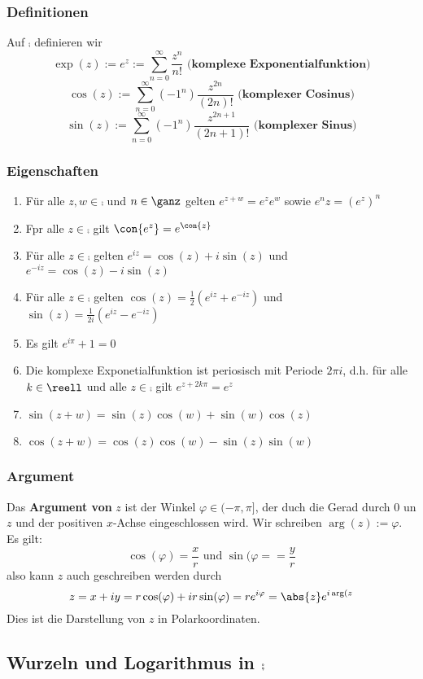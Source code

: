 \documentclass{kit}
\begin{document}
    \subsubsection{Definitionen}
      Auf $\comp$ definieren wir
      $$\exp(z):=e^z:=\sum^\infty_{n=0}\frac{z^n}{n!}\textbf{ (komplexe Exponentialfunktion)}$$
      $$\cos(z):=\sum^\infty_{n=0}(-1^n)\frac{z^{2n}}{(2n)!}\textbf{ (komplexer Cosinus)}$$
      $$\sin(z):=\sum^\infty_{n=0}(-1^n)\frac{z^{2n+1}}{(2n+1)!}\textbf{ (komplexer Sinus)}$$
    \subsubsection{Eigenschaften}
      \begin{enumerate}
        \item Für alle $z,w\in\comp$ und $n\in\ganz$ gelten $e^{z+w}=e^ze^w$ sowie $e^nz=(e^z)^n$
        \item Fpr alle $z\in\comp$ gilt $\con{e^z}=e^{\con{z}}$
        \item Für alle $z\in\comp$ gelten $e^{iz}=\cos(z)+i\sin(z)$ und $e^{-iz}=\cos(z)-i\sin(z)$
        \item Für alle $z\in\comp$ gelten $\cos(z)=\frac{1}{2}(e^{iz}+e^{-iz})$ und $\sin(z)=\frac{1}{2i}(e^{iz}-e^{-iz})$
        \item Es gilt $e^{i\pi}+1=0$
        \item Die komplexe Exponetialfunktion ist periosisch mit Periode $2\pi i$, d.h. für alle $k\in\reell$ und alle 
          $z\in\comp$ gilt $e^{z+2k\pi}=e^z$
        \item $\sin(z+w)=\sin(z)\cos(w)+\sin(w)\cos(z)$
        \item $\cos(z+w)=\cos(z)\cos(w)-\sin(z)\sin(w)$
      \end{enumerate}
    \subsubsection{Argument}
      Das \textbf{Argument von} $z$ ist der Winkel $\varphi\in(-\pi,\pi]$, der duch die Gerad durch 0 un $z$ und der
      positiven $x$-Achse eingeschlossen wird. Wir schreiben $\arg(z):=\varphi$. Es gilt:
      $$\cos(\varphi)=\frac{x}{r}\text{ und }\sin(\varphi==\frac{y}{r}$$
      also kann $z$ auch geschreiben werden durch
      $$z=x+iy=r\cos(\varphi)+ir\sin(\varphi)=re^{i\varphi}=\abs{z}e^{i\arg(z}$$
      Dies ist die Darstellung von $z$ in Polarkoordinaten.
  \subsection{Wurzeln und Logarithmus in \texorpdfstring{$\comp$}{}}
\end{document}
